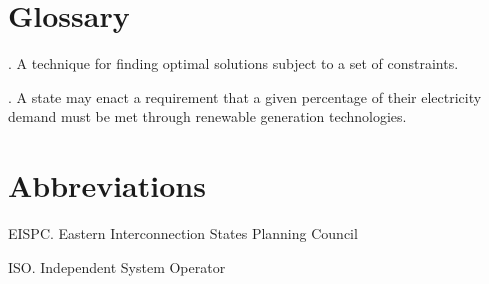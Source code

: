 \documentclass[oneside,12pt]{report}
\begin{document}
\appendix
{}


\chapter{Glossary}\label{Glossary}

\vspace{12pt} 

\vspace{8pt}
. A technique for finding optimal solutions subject to a set of constraints. 

\vspace{8pt}
. A state may enact a requirement that a given percentage of their electricity demand must be met through renewable generation technologies. 
\chapter{Abbreviations}\label{Abbreviations}


\noindent EISPC. Eastern Interconnection States Planning Council

\vspace{5pt}

\noindent ISO. Independent System Operator





\renewcommand\bibname{Selected Bibliography Including Cited Works}
\nocite{*}  %

\end{document}
